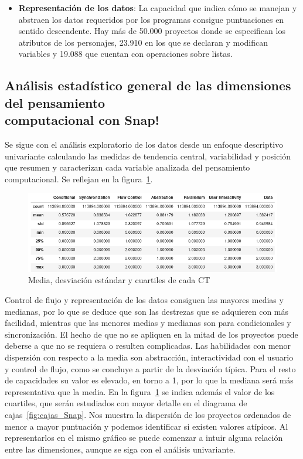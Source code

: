 \documentclass[a4paper, 12pt]{book}
\begin{document}
\begin{itemize}
    \item \textbf{Representación de los datos}: La capacidad que indica cómo se manejan y abstraen los datos requeridos por los programas consigue puntuaciones en sentido descendente. Hay más de 50.000 proyectos donde se especifican los atributos de los personajes, 23.910 en los que se declaran y modifican variables y 19.088 que cuentan con operaciones sobre listas. 
\end{itemize}    

\subsection{Análisis estadístico general de las dimensiones del pensamiento \\computacional con Snap!}
\label{subsec:estad_pc_Snap}

Se sigue con el análisis exploratorio de los datos desde un enfoque descriptivo univariante calculando las medidas de tendencia central, variabilidad y posición que resumen y caracterizan cada variable analizada del pensamiento computacional. Se reflejan en la figura~\ref{fig:describe_Snap}.

\begin{figure}[H]
    \centering
    \includegraphics[width=1\textwidth]{img/describe_Snap.png}
    \caption{Media, desviación estándar y cuartiles de cada CT}
    \label{fig:describe_Snap}
\end{figure}

Control de flujo y representación de los datos consiguen las mayores medias y medianas, por lo que se deduce que son las destrezas que se adquieren con más facilidad, mientras que las menores medias y medianas son para condicionales y sincronización. El hecho de que no se apliquen en la mitad de los proyectos puede deberse a que no se requiera o resulten complicadas. Las habilidades con menor dispersión con respecto a la media son abstracción, interactividad con el usuario y control de flujo, como se concluye a partir de la desviación típica. Para el resto de capacidades su valor es elevado, en torno a 1,
por lo que la mediana será más representativa que la media. En la figura~\ref{fig:describe_Snap} se indica además el valor de los cuartiles, que serán estudiados con mayor detalle en el diagrama de cajas~\ref{fig:cajas_Snap}.
Nos muestra la dispersión de los proyectos ordenados de menor a mayor puntuación y podemos identificar si existen valores atípicos. Al representarlos en el mismo gráfico se puede comenzar a intuir alguna relación entre las dimensiones, aunque se siga con el análisis univariante.
\end{document}
